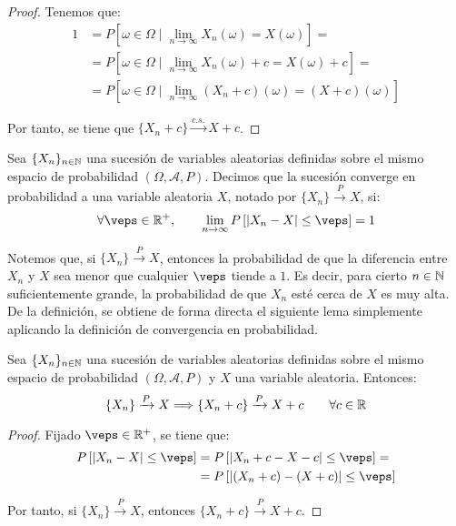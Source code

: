 \begin{proof}
    Tenemos que:
    \begin{align*}
        1 &= P\left[\omega\in \Omega\mid \lim_{n\to \infty} X_n(\omega) = X(\omega)\right]
        =\\&= P\left[\omega\in \Omega\mid \lim_{n\to \infty} X_n(\omega) +c = X(\omega)+c\right]
        =\\&= P\left[\omega\in \Omega\mid \lim_{n\to \infty} (X_n+c)(\omega) = (X+c)(\omega)\right]
    \end{align*}

    Por tanto, se tiene que $\{X_n+ c\} \xrightarrow{c.s.} X + c$.
\end{proof}

\begin{definicion}
    Sea $\{X_n\}_{n\in \mathbb{N}}$ una sucesión de variables aleatorias definidas sobre el mismo espacio de probabilidad $(\Omega, \mathcal{A}, P)$. Decimos que la sucesión converge en probabilidad a una variable aleatoria $X$, notado por $\{X_n\} \xrightarrow{P} X$, si:
    \begin{equation*}
        \forall \veps \in \bb{R}^+,\qquad \lim_{n\to \infty} P\left[|X_n - X| \leq \veps\right] = 1
    \end{equation*}
\end{definicion}
Notemos que, si $\{X_n\} \xrightarrow{P} X$, entonces la probabilidad de que la diferencia entre $X_n$ y $X$ sea menor que cualquier $\veps$ tiende a $1$. Es decir, para cierto $n\in \mathbb{N}$ suficientemente grande, la probabilidad de que $X_n$ esté cerca de $X$ es muy alta. De la definición, se obtiene de forma directa el siguiente lema simplemente aplicando la definición de convergencia en probabilidad.
\begin{lema}\label{lema:suma_convergencia_probabilidad}
    Sea $\{X_n\}_{n\in \mathbb{N}}$ una sucesión de variables aleatorias definidas sobre el mismo espacio de probabilidad $(\Omega, \mathcal{A}, P)$ y $X$ una variable aleatoria. Entonces:
    \begin{equation*}
        \{X_n\} \xrightarrow{P} X \Longrightarrow \{X_n+ c\} \xrightarrow{P} X + c \qquad \forall c\in \mathbb{R}
    \end{equation*}
\end{lema}
\begin{proof}
    Fijado $\veps \in \bb{R}^+$, se tiene que:
    \begin{align*}
        P\left[|X_n - X| \leq \veps\right]
        &= P\left[|X_n + c - X-c| \leq \veps\right]
        =\\&= P\left[|(X_n + c) - (X+c)| \leq \veps\right]
    \end{align*}

    Por tanto, si $\{X_n\} \xrightarrow{P} X$, entonces $\{X_n+ c\} \xrightarrow{P} X + c$.
\end{proof}

